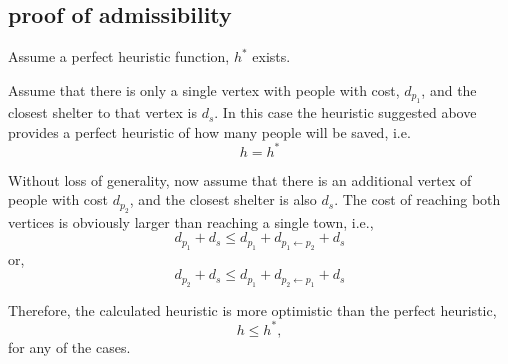 \documentclass{article}                     %
\begin{document}
\subsection{proof of admissibility}
Assume a perfect heuristic function, $ h^* $ exists.

Assume that there is only  a single vertex with people with cost, $ d_{p_1} $, and the closest shelter to that vertex is $ d_s $. In this case the heuristic suggested above provides a perfect heuristic of how many people will be saved, i.e.
\begin{equation}
h =  h^*
\end{equation}

Without loss of generality, now assume that there is an additional vertex of people with cost $ d_{p_2} $, and the closest shelter is also $ d_s $. The cost of reaching both vertices is obviously larger than reaching a single town, i.e., 
\begin{equation}\label{key}
d_{p_1}+d_s \leq d_{p_1}+d_{p_1 \leftarrow p_2}+d_s
\end{equation}
or,
\begin{equation}\label{key}
d_{p_2}+d_s \leq d_{p_1}+d_{p_2 \leftarrow p_1}+d_s
\end{equation}

Therefore, the calculated heuristic is more optimistic than the perfect heuristic, 
\begin{equation}\label{key}
h\leq h^*,
\end{equation}
for any of the cases.
\end{document}
